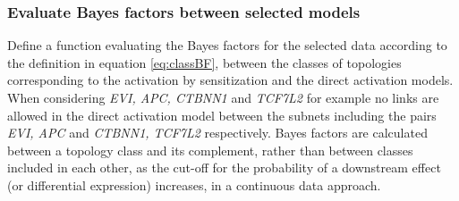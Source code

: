 \documentclass[a4paper]{article}\usepackage[]{graphicx}\usepackage[]{color}
\begin{document}
\subsubsection*{Evaluate Bayes factors between selected models}
Define a function evaluating the Bayes factors for the selected data according to the definition in equation \eqref{eq:classBF}, between the classes of topologies corresponding to the activation by sensitization and the direct activation models. When considering \emph{EVI, APC, CTBNN1} and \emph{TCF7L2} for example no links are allowed in the direct activation model between the subnets including the pairs \emph{EVI, APC} and \emph{CTBNN1, TCF7L2} respectively.
Bayes factors are calculated between a topology class and its complement, rather than between classes included in each other, as the cut-off for the probability of a downstream effect (or differential expression) increases, in a continuous data approach.
\end{document}
